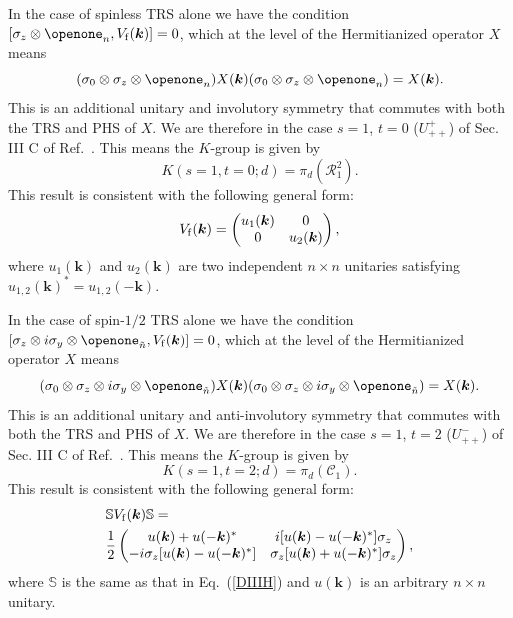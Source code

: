 \documentclass[prl,twocolumn,preprintnumbers,superscriptaddress,amsmath,amssymb]{revtex4-1}
\begin{document}
In the case of spinless TRS alone we have the condition $[\sigma_z\otimes\openone_n,V_{\rm f}(\boldsymbol{k})]=0$, which at the level of the Hermitianized operator $X$ means
\begin{equation}
    (\sigma_0\otimes\sigma_z\otimes\openone_n) X(\boldsymbol{k}) (\sigma_0\otimes\sigma_z\otimes\openone_n) = X(\boldsymbol{k}).
\end{equation}
This is an additional unitary and involutory symmetry that commutes with both the TRS and PHS of $X$. We are therefore in the case $s=1$, $t=0$ ($U^+_{++}$) of Sec. III C of Ref.~\cite{Shiozaki2014}. This means the $K$-group is given by 
\begin{equation}
    K(s=1,t=0;d)=\pi_d(\mathcal{R}_1^2). 
\end{equation}
This result is consistent with the following general form:
\begin{equation}
V_{\rm f}(\boldsymbol{k})=\begin{pmatrix} u_1(\boldsymbol{k}) & 0 \\ 0 & u_2(\boldsymbol{k}) \end{pmatrix},
\label{BDIV}
\end{equation}
where $u_1(\boldsymbol{k})$ and $u_2(\boldsymbol{k})$ are two independent $n\times n$ unitaries satisfying $u_{1,2}(\boldsymbol{k})^*=u_{1,2}(-\boldsymbol{k})$.

In the case of spin-$1/2$ TRS alone we have the condition $[\sigma_z\otimes i\sigma_y\otimes\openone_{\tilde n},V_{\rm f}(\boldsymbol{k})]=0$, which at the level of the Hermitianized operator $X$ means
\begin{equation}
    (\sigma_0\otimes\sigma_z\otimes i\sigma_y\otimes\openone_{\tilde n}) X(\boldsymbol{k}) (\sigma_0\otimes\sigma_z\otimes i\sigma_y\otimes\openone_{\tilde n}) = X(\boldsymbol{k}).
\end{equation}
This is an additional unitary and anti-involutory symmetry that commutes with both the TRS and PHS of $X$. We are therefore in the case $s=1$, $t=2$ ($U^-_{++}$) of Sec. III C of Ref.~\cite{Shiozaki2014}. This means the $K$-group is given by 
\begin{equation}
    K(s=1,t=2;d)=\pi_d(\mathcal{C}_1).
\end{equation}
This result is consistent with the following general form:
\begin{align}
&\mathbb{S}V_{\rm f}(\boldsymbol{k})\mathbb{S}=\nonumber \\
&\frac{1}{2}\begin{pmatrix} u(\boldsymbol{k}) + u(-\boldsymbol{k})^* & i[u(\boldsymbol{k}) - u(-\boldsymbol{k})^*] \sigma_z \\ - i\sigma_z [u(\boldsymbol{k}) - u(-\boldsymbol{k})^*] & \sigma_z [u(\boldsymbol{k}) + u(-\boldsymbol{k})^*] \sigma_z \end{pmatrix} ,
\label{eq:supp-V-as-function-of-Utilde}
\end{align}
where $\mathbb{S}$ is the same as that in Eq.~(\ref{DIIIH}) and $u(\boldsymbol{k})$ is an arbitrary $n \times n$ unitary.
\end{document}
